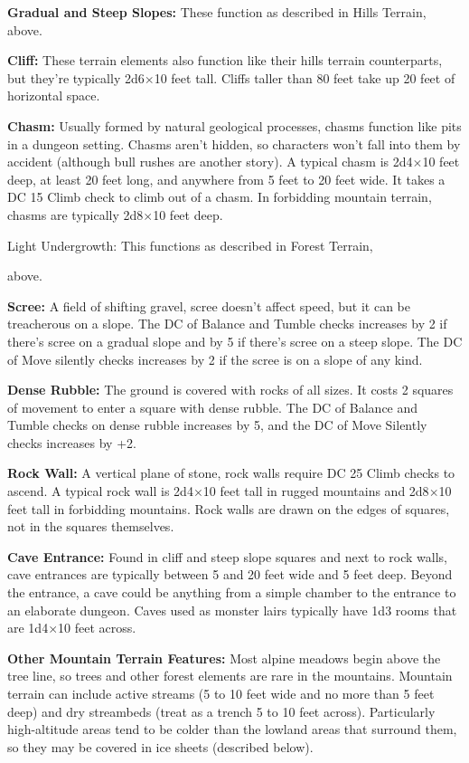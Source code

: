 \documentclass{article}
\begin{document}
\textbf{Gradual and Steep Slopes:} These function as described in Hills Terrain, 
above.

\textbf{Cliff: }These terrain elements also function like their hills terrain counterparts, 
but they're typically 2d6\ensuremath{\times}10 feet tall. Cliffs taller than 80 
feet take up 20 feet of horizontal space.

\textbf{Chasm: }Usually formed by natural geological processes, chasms function 
like pits in a dungeon setting. Chasms aren't hidden, so characters won't fall 
into them by accident (although bull rushes are another story). A typical chasm 
is 2d4\ensuremath{\times}10 feet deep, at least 20 feet long, and anywhere from 
5 feet to 20 feet wide. It takes a DC 15 Climb check to climb out of a chasm. In 
forbidding mountain terrain, chasms are typically 2d8\ensuremath{\times}10 feet 
deep.

Light Undergrowth: This functions as described in Forest Terrain,

above.

\textbf{Scree:} A field of shifting gravel, scree doesn't affect speed, but it 
can be treacherous on a slope. The DC of Balance and Tumble checks increases by 
2 if there's scree on a gradual slope and by 5 if there's scree on a steep slope. 
The DC of Move silently checks increases by 2 if the scree is on a slope of any 
kind.

\textbf{Dense Rubble: }The ground is covered with rocks of all sizes. It costs 
2 squares of movement to enter a square with dense rubble. The DC of Balance and 
Tumble checks on dense rubble increases by 5, and the DC of Move Silently checks 
increases by +2. 

\textbf{Rock Wall:} A vertical plane of stone, rock walls require DC 25 Climb checks 
to ascend. A typical rock wall is 2d4\ensuremath{\times}10 feet tall in rugged 
mountains and 2d8\ensuremath{\times}10 feet tall in forbidding mountains. Rock 
walls are drawn on the edges of squares, not in the squares themselves.

\textbf{Cave Entrance:} Found in cliff and steep slope squares and next to rock 
walls, cave entrances are typically between 5 and 20 feet wide and 5 feet deep. 
Beyond the entrance, a cave could be anything from a simple chamber to the entrance 
to an elaborate dungeon. Caves used as monster lairs typically have 1d3 rooms that 
are 1d4\ensuremath{\times}10 feet across. 

\textbf{Other Mountain Terrain Features:} Most alpine meadows begin above the tree 
line, so trees and other forest elements are rare in the mountains. Mountain terrain 
can include active streams (5 to 10 feet wide and no more than 5 feet deep) and 
dry streambeds (treat as a trench 5 to 10 feet across). Particularly high-altitude 
areas tend to be colder than the lowland areas that surround them, so they may 
be covered in ice sheets (described below).
\end{document}
